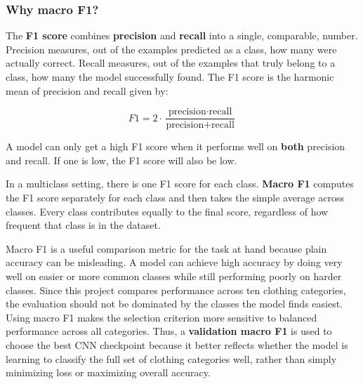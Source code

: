 \documentclass[11pt]{article}
\begin{document}
\subsubsection{Why macro F1?}\label{why-macro-f1}

The \textbf{F1 score} combines \textbf{precision} and \textbf{recall}
into a single, comparable, number. Precision measures, out of the
examples predicted as a class, how many were actually correct. Recall
measures, out of the examples that truly belong to a class, how many the
model successfully found. The F1 score is the harmonic mean of precision
and recall given by:

\[
F1 = 2 \cdot \frac{\text{precision} \cdot \text{recall}}{\text{precision} + \text{recall}}
\]

A model can only get a high F1 score when it performs well on
\textbf{both} precision and recall. If one is low, the F1 score will
also be low.

In a multiclass setting, there is one F1 score for each class.
\textbf{Macro F1} computes the F1 score separately for each class and
then takes the simple average across classes. Every class contributes
equally to the final score, regardless of how frequent that class is in
the dataset.

Macro F1 is a useful comparison metric for the task at hand because
plain accuracy can be misleading. A model can achieve high accuracy by
doing very well on easier or more common classes while still performing
poorly on harder classes. Since this project compares performance across
ten clothing categories, the evaluation should not be dominated by the
classes the model finds easiest. Using macro F1 makes the selection
criterion more sensitive to balanced performance across all categories.
Thus, a \textbf{validation macro F1} is used to choose the best CNN
checkpoint because it better reflects whether the model is learning to
classify the full set of clothing categories well, rather than simply
minimizing loss or maximizing overall accuracy.
\end{document}
